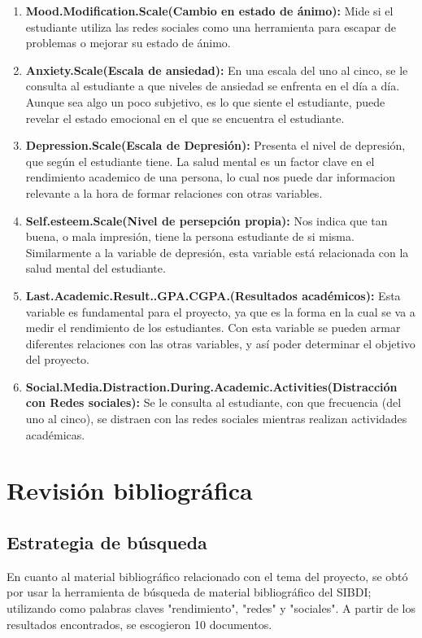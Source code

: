 \documentclass[12pt]{article}
\begin{document}
\begin{enumerate}
    \item \textbf{Mood.Modification.Scale(Cambio en estado de ánimo):} Mide si el estudiante utiliza las redes sociales como una herramienta para escapar de problemas o mejorar su estado de ánimo.
    
    \item \textbf{Anxiety.Scale(Escala de ansiedad):} En una escala del uno al cinco, se le consulta al estudiante a que niveles de ansiedad se enfrenta en el día a día. Aunque sea algo un poco subjetivo, es lo que siente el estudiante, puede revelar el estado emocional en el que se encuentra el estudiante.
    
    \item \textbf{Depression.Scale(Escala de Depresión):} Presenta el nivel de depresión, que según el estudiante tiene. La salud mental es un factor clave en el rendimiento academico de una persona, lo cual nos puede dar informacion relevante a la hora de formar relaciones con otras variables.
    
    \item \textbf{Self.esteem.Scale(Nivel de persepción propia):} Nos indica que tan buena, o mala impresión, tiene la persona estudiante de si misma. Similarmente a la variable de depresión, esta variable está relacionada con la salud mental del estudiante.
    
    \item \textbf{Last.Academic.Result..GPA.CGPA.(Resultados académicos):} Esta variable es fundamental para el proyecto, ya que es la forma en la cual se va a medir el rendimiento de los estudiantes. Con esta variable se pueden armar diferentes relaciones con las otras variables, y así poder determinar el objetivo del proyecto.
    
    \item \textbf{Social.Media.Distraction.During.Academic.Activities(Distracción con Redes sociales):} Se le consulta al estudiante, con que frecuencia (del uno al cinco), se distraen con las redes sociales mientras realizan actividades académicas. 
\end{enumerate}

\section{Revisión bibliográfica}
\subsection{Estrategia de búsqueda}
En cuanto al material bibliográfico relacionado con el tema del proyecto, se obtó por usar la herramienta de búsqueda de material bibliográfico del SIBDI; utilizando como palabras claves "rendimiento", "redes" y "sociales". A partir de los resultados encontrados, se escogieron 10 documentos.
\end{document}
